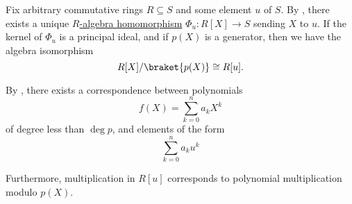 \begin{remark}\label{rem:adjoining_roots}
  Fix arbitrary commutative rings \( R \subseteq S \) and some element \( u \) of \( S \). By , there exists a unique \hyperref[def:algebra_over_ring/homomorphism]{\( R \)-algebra homomorphism} \( \Phi_u: R[X] \to S \) sending \( X \) to \( u \). If the kernel of \( \Phi_u \) is a principal ideal, and if \( p(X) \) is a generator, then we have the algebra isomorphism
  \begin{equation*}
    R[X] / \braket{ p(X) } \cong R[u].
  \end{equation*}

  By , there exists a correspondence between polynomials
  \begin{equation*}
    f(X) = \sum_{k=0}^n a_k X^k
  \end{equation*}
  of degree less than \( \deg p \), and elements of the form
  \begin{equation*}
    \sum_{k=0}^n a_k u^k
  \end{equation*}

  Furthermore, multiplication in \( R[u] \) corresponds to polynomial multiplication modulo \( p(X) \).
\end{remark}

